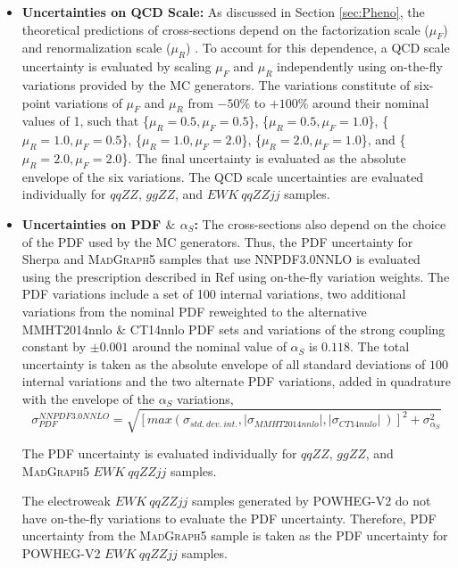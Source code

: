 \begin{itemize}
\item{\textbf{Uncertainties on QCD Scale:} As discussed in Section \ref{sec:Pheno}, the theoretical predictions of cross-sections depend on the factorization scale ($\mu_{F}$) and renormalization scale ($\mu_{R}$) \cite{QCDScaleAndPDFUnc}. To account for this dependence, a QCD scale uncertainty is evaluated by scaling $\mu_{F}$ and $\mu_{R}$ independently using on-the-fly variations provided by the MC generators. The variations constitute of six-point variations of $\mu_{F}$ and $\mu_{R}$ from $-50\%$ to $+100\%$ around their nominal values of 1, such that \{$\mu_R = 0.5, \mu_F = 0.5$\}, \{$\mu_R = 0.5, \mu_F = 1.0$\}, \{$\mu_R = 1.0, \mu_F = 0.5$\}, \{$\mu_R = 1.0, \mu_F = 2.0$\}, \{$\mu_R = 2.0, \mu_F = 1.0$\}, and \{$\mu_R = 2.0, \mu_F = 2.0$\}. The final uncertainty is evaluated as the absolute envelope of the six variations. The QCD scale uncertainties are evaluated individually for $qqZZ$, $ggZZ$, and $EWK~ qqZZjj$ samples.
}
\item{\textbf{Uncertainties on PDF $\&$ $\alpha_{S}$:} The cross-sections also depend on the choice of the PDF used by the MC generators. Thus, the PDF uncertainty for Sherpa and \textsc{MadGraph5} samples that use NNPDF3.0NNLO is evaluated using the prescription described in Ref \cite{PDFForRunII} using on-the-fly variation weights. The PDF variations include a set of 100 internal variations, two additional variations from the nominal PDF reweighted to the alternative MMHT2014nnlo \cite{MMHT2014PDFs} $\&$ CT14nnlo \cite{CT14nnlo} PDF sets and variations of the strong coupling constant by $\pm0.001$ around the nominal value of $\alpha_{S}$ is $0.118$. The total uncertainty is taken as the absolute envelope of all standard deviations of $100$ internal variations and the two alternate PDF variations, added in quadrature with the envelope of the $\alpha_{S}$ variations, 
\begin{equation}
    \sigma_{PDF}^{NNPDF3.0NNLO} = \sqrt{ [ max (\sigma_{std.~dev.~int.}, |\sigma_{MMHT2014nnlo}| , |\sigma_{CT14nnlo}|~)]^2 + \sigma_{\alpha_S}^2 }
\end{equation}

The PDF uncertainty is evaluated individually for $qqZZ$, $ggZZ$, and \textsc{MadGraph5} $EWK~ qqZZjj$ samples.

The electroweak $EWK~qqZZjj$ samples generated by \textsc{POWHEG-V2} do not have on-the-fly variations to evaluate the PDF uncertainty. Therefore, PDF uncertainty from the \textsc{MadGraph5} sample is taken as the PDF uncertainty for \textsc{POWHEG-V2} $EWK~qqZZjj$ samples.
}


\end{itemize}
